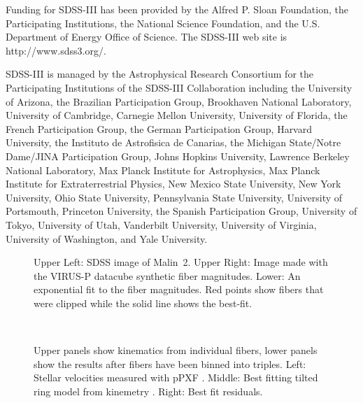 \documentclass[12pt,preprint]{aastex}
\begin{document}
Funding for SDSS-III has been provided by the Alfred P. Sloan Foundation, the Participating Institutions, the National Science Foundation, and the U.S. Department of Energy Office of Science. The SDSS-III web site is http://www.sdss3.org/.

SDSS-III is managed by the Astrophysical Research Consortium for the Participating Institutions of the SDSS-III Collaboration including the University of Arizona, the Brazilian Participation Group, Brookhaven National Laboratory, University of Cambridge, Carnegie Mellon University, University of Florida, the French Participation Group, the German Participation Group, Harvard University, the Instituto de Astrofisica de Canarias, the Michigan State/Notre Dame/JINA Participation Group, Johns Hopkins University, Lawrence Berkeley National Laboratory, Max Planck Institute for Astrophysics, Max Planck Institute for Extraterrestrial Physics, New Mexico State University, New York University, Ohio State University, Pennsylvania State University, University of Portsmouth, Princeton University, the Spanish Participation Group, University of Tokyo, University of Utah, Vanderbilt University, University of Virginia, University of Washington, and Yale University.





\begin{figure}
\caption{Upper Left:  SDSS image of Malin~2.
Upper Right:  Image made with the VIRUS-P datacube synthetic fiber magnitudes.
Lower:  An exponential fit to the fiber magnitudes.
Red points show fibers that were clipped while the solid line shows the best-fit.
\label{Malin2_fibers} }
\end{figure}








\begin{figure*}
 \\
\caption{Upper panels show kinematics from individual fibers, lower panels show the results after fibers have been binned into triples.
Left:  Stellar velocities measured with pPXF \citep{Cappellari04}. Middle:  Best fitting tilted ring model from kinemetry \citep{Krajn06}. Right: Best fit residuals.
\label{malin_kinem_fibers}}
\end{figure*}
\end{document}
